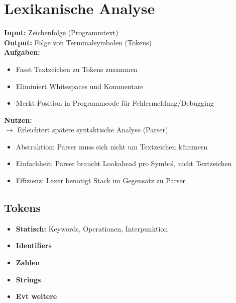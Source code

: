 
\section{Lexikanische Analyse}
\textbf{Input:} Zeichenfolge (Programmtext)\\
\textbf{Output:} Folge von Terminalsymbolen (Tokens)\\
\textbf{Aufgaben:}
\begin{itemize}[topsep=0pt]
    \itemsep -0.2em
    \item Fasst Textzeichen zu Tokens zusammen
    \item Eliminiert Whitespaces und Kommentare
    \item Merkt Position in Programmcode für Fehlermeldung/Debugging
\end{itemize}
\textbf{Nutzen:}\\
$\rightarrow$ Erleichtert spätere syntaktische Analyse (Parser)
\begin{itemize}[topsep=0pt]
    \itemsep -0.2em
    \item Abstraktion: Parser muss sich nicht um Textzeichen kümmern
    \item Einfachheit: Parser braucht Lookahead pro Symbol, nicht Textzeichen
    \item Effizienz: Lexer benötigt Stack im Gegensatz zu Parser
\end{itemize}
\subsection{Tokens}
\begin{itemize}[topsep=0pt]
    \itemsep -0.2em
    \item \textbf{Statisch:} Keywords, Operationen, Interpunktion
    \item \textbf{Identifiers}
    \item \textbf{Zahlen}
    \item \textbf{Strings}
    \item \textbf{Evt weitere}
\end{itemize}


